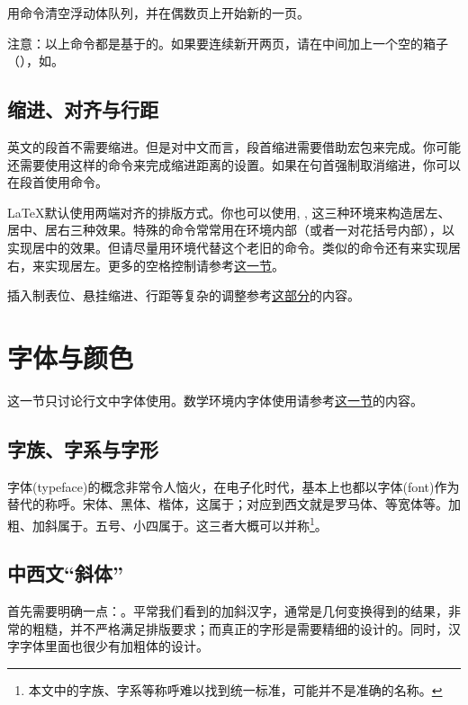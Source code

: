 用命令清空浮动体队列，并在偶数页上开始新的一页。

注意：以上命令都是基于的。如果要连续新开两页，请在中间加上一个空的箱子（），如。

\subsection{缩进、对齐与行距}
英文的段首不需要缩进。但是对中文而言，段首缩进需要借助宏包来完成。你可能还需要使用这样的命令来完成缩进距离的设置。如果在句首强制取消缩进，你可以在段首使用命令。

\LaTeX 默认使用两端对齐的排版方式。你也可以使用, , 这三种环境来构造居左、居中、居右三种效果。特殊的命令常常用在环境内部（或者一对花括号内部），以实现居中的效果。但请尽量用环境代替这个老旧的命令。类似的命令还有来实现居右，来实现居左。更多的空格控制请参考\hyperref[sec:hvspace]{这一节}。

插入制表位、悬挂缩进、行距等复杂的调整参考\hyperref[sec:hvspace]{这部分}的内容。

\section{字体与颜色}
\label{sec:font}
这一节只讨论行文中字体使用。数学环境内字体使用请参考\hyperref[sec:mathfont]{这一节}的内容。

\subsection{字族、字系与字形}
字体(typeface)的概念非常令人恼火，在电子化时代，基本上也都以字体(font)作为替代的称呼。宋体、黑体、楷体，这属于；对应到西文就是罗马体、等宽体等。加粗、加斜属于。五号、小四属于。这三者大概可以并称\footnote{本文中的字族、字系等称呼难以找到统一标准，可能并不是准确的名称。}。

\subsection{中西文“斜体”}
首先需要明确一点：。平常我们看到的加斜汉字，通常是几何变换得到的结果，非常的粗糙，并不严格满足排版要求；而真正的字形是需要精细的设计的。同时，汉字字体里面也很少有加粗体的设计。


